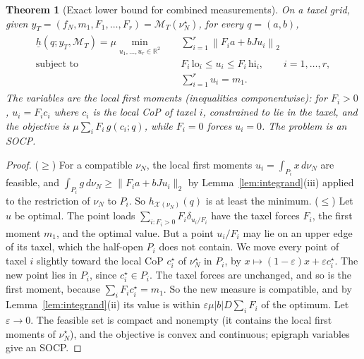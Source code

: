 \documentclass[11pt,a4paper]{article}
\theoremstyle{plain}
\newtheorem{theorem}{Theorem}[section]
\newcommand{\R}{\mathbb{R}}
\newcommand{\X}{\mathcal X}
\begin{document}
\begin{theorem}[Exact lower bound for combined measurements]
\label{thm:combined_lower}
    On a taxel grid, given $y_T=(f_N,m_1,F_1,\ldots,F_r)=\mathcal M_T(\nu_N^\star)$, for every $q=(a,b)$,
    \begin{align}
        \label{eq:combined_lower_reduction}
        \boxed{
        \begin{aligned}
        \underline h(q;y_T,\mathcal M_T)
        =
        \mu\min_{u_1,\ldots,u_r\in\R^2}\quad&
        \sum_{i=1}^r
        \left\|F_ia+bJu_i\right\|_2\\
        \text{subject to}\quad&
        F_i\,\mathrm{lo}_i\le u_i\le F_i\,\mathrm{hi}_i,
        \qquad i=1,\ldots,r,\\
        &
        \sum_{i=1}^ru_i=m_1.
        \end{aligned}}
    \end{align}
    The variables are the local first moments (inequalities componentwise): for $F_i>0$, $u_i=F_ic_i$ where $c_i$ is the local CoP of taxel $i$, constrained to lie in the taxel, and the objective is
    $\mu\sum_iF_i\,g(c_i;q)$, while $F_i=0$ forces $u_i=0$. The problem is an SOCP.
\end{theorem}
\begin{proof}
    ($\ge$) For a compatible $\nu_N$, the local first moments $u_i=\int_{P_i}x\,d\nu_N$ are feasible, and $\int_{P_i}g\,d\nu_N\ge\|F_ia+bJu_i\|_2$ by Lemma~\ref{lem:integrand}(iii)
    applied to the restriction of $\nu_N$ to $P_i$. So $h_{\X(\nu_N)}(q)$ is at least the minimum.
    ($\le$) Let $u$ be optimal. The point loads $\sum_{i:F_i>0}F_i\delta_{u_i/F_i}$ have the taxel forces $F_i$, the first moment $m_1$, and the optimal value. But a point $u_i/F_i$ may lie on an upper edge
    of its taxel, which the half-open $P_i$ does not contain. We move every point of taxel $i$ slightly toward the local CoP $c_i^\star$ of $\nu_N^\star$ in $P_i$, by $x\mapsto(1-\varepsilon)x+\varepsilon c_i^\star$.
    The new point lies in $P_i$, since $c_i^\star\in P_i$. The taxel forces are unchanged, and so is the first moment, because $\sum_iF_ic_i^\star=m_1$. So the new measure is compatible, and by
    Lemma~\ref{lem:integrand}(ii) its value is within $\varepsilon\mu|b|D\sum_iF_i$ of the optimum. Let $\varepsilon\to0$.
    The feasible set is compact and nonempty (it contains the local first moments of $\nu_N^\star$), and the objective is convex and continuous; epigraph variables give an SOCP.
\end{proof}
\end{document}
